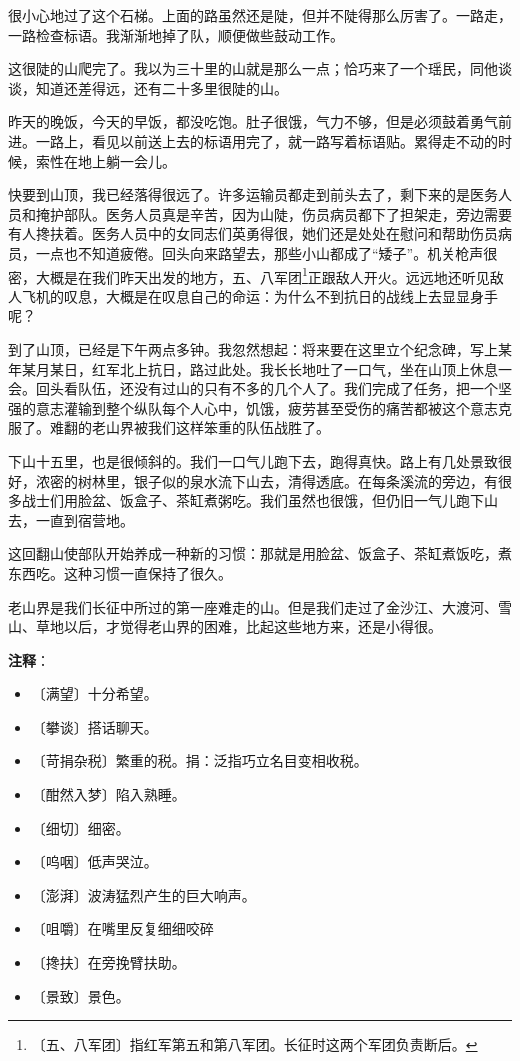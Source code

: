 \documentclass[12pt,UTF-8,openany]{ctexbook}
\begin{document}
\begin{normalsize}
    很小心地过了这个石梯。上面的路虽然还是陡，但并不陡得那么厉害了。一路走，一路检查标语。我渐渐地掉了队，顺便做些鼓动工作。
    
    这很陡的山爬完了。我以为三十里的山就是那么一点；恰巧来了一个瑶民，同他谈谈，知道还差得远，还有二十多里很陡的山。
    
    昨天的晚饭，今天的早饭，都没吃饱。肚子很饿，气力不够，但是必须鼓着勇气前进。一路上，看见以前送上去的标语用完了，就一路写着标语贴。累得走不动的时候，索性在地上躺一会儿。
    
    快要到山顶，我已经落得很远了。许多运输员都走到前头去了，剩下来的是医务人员和掩护部队。医务人员真是辛苦，因为山陡，伤员病员都下了担架走，旁边需要有人搀扶着。医务人员中的女同志们英勇得很，她们还是处处在慰问和帮助伤员病员，一点也不知道疲倦。回头向来路望去，那些小山都成了“矮子”。机关枪声很密，大概是在我们昨天出发的地方，五、八军团\footnote{〔五、八军团〕指红军第五和第八军团。长征时这两个军团负责断后。}正跟敌人开火。远远地还听见敌人飞机的叹息，大概是在叹息自己的命运：为什么不到抗日的战线上去显显身手呢？
    
    到了山顶，已经是下午两点多钟。我忽然想起：将来要在这里立个纪念碑，写上某年某月某日，红军北上抗日，路过此处。我长长地吐了一口气，坐在山顶上休息一会。回头看队伍，还没有过山的只有不多的几个人了。我们完成了任务，把一个坚强的意志灌输到整个纵队每个人心中，饥饿，疲劳甚至受伤的痛苦都被这个意志克服了。难翻的老山界被我们这样笨重的队伍战胜了。
    
    下山十五里，也是很倾斜的。我们一口气儿跑下去，跑得真快。路上有几处景致很好，浓密的树林里，银子似的泉水流下山去，清得透底。在每条溪流的旁边，有很多战士们用脸盆、饭盒子、茶缸煮粥吃。我们虽然也很饿，但仍旧一气儿跑下山去，一直到宿营地。
    
    这回翻山使部队开始养成一种新的习惯：那就是用脸盆、饭盒子、茶缸煮饭吃，煮东西吃。这种习惯一直保持了很久。
    
    老山界是我们长征中所过的第一座难走的山。但是我们走过了金沙江、大渡河、雪山、草地以后，才觉得老山界的困难，比起这些地方来，还是小得很。
    
\end{normalsize}


\newpage

\textbf{注释}：

\vspace{-1em}

\begin{itemize}
    \setlength\itemsep{-0.2em}
    \item 〔满望〕十分希望。
    \item 〔攀谈〕搭话聊天。
    \item 〔苛捐杂税〕繁重的税。捐：泛指巧立名目变相收税。
    \item 〔酣然入梦〕陷入熟睡。
    \item 〔细切〕细密。
    \item 〔呜咽〕低声哭泣。
    \item 〔澎湃〕波涛猛烈产生的巨大响声。
    \item 〔咀嚼〕在嘴里反复细细咬碎
    \item 〔搀扶〕在旁挽臂扶助。
    \item 〔景致〕景色。
\end{itemize}
\end{document}
